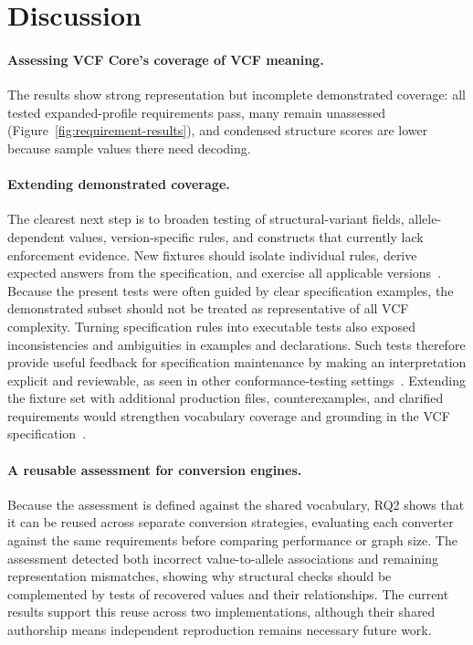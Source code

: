 \section{Discussion}
\label{sec:discussion}


\paragraph{Assessing VCF Core's coverage of VCF meaning.}
\label{sec:summary}
The results show strong representation but incomplete demonstrated coverage: all tested expanded-profile requirements pass, many remain unassessed (Figure~\ref{fig:requirement-results}), and condensed structure scores are lower because sample values there need decoding. 

\paragraph{Extending demonstrated coverage.}
The clearest next step is to broaden testing of structural-variant fields, allele-dependent values, version-specific rules, and constructs that currently lack enforcement evidence. 
New fixtures should isolate individual rules, derive expected answers from the specification, and exercise all applicable versions~\cite{samod2016,blomqvist2012ontologytesting}. 
Because the present tests were often guided by clear specification examples, the demonstrated subset should not be treated as representative of all VCF complexity.
Turning specification rules into executable tests also exposed inconsistencies and ambiguities in examples and declarations. 
Such tests therefore provide useful feedback for specification maintenance by making an interpretation explicit and reviewable, as seen in other conformance-testing settings~\cite{bishop2005conformance,niu2022interop}. 
Extending the fixture set with additional production files, counterexamples, and clarified requirements would strengthen vocabulary coverage and grounding in the VCF specification~\cite{beier2022fairvcf}.

\paragraph{A reusable assessment for conversion engines.}
Because the assessment is defined against the shared vocabulary, RQ2 shows that it can be reused across separate conversion strategies, evaluating each converter against the same requirements before comparing performance or graph size.
The assessment detected both incorrect value-to-allele associations and remaining representation mismatches, showing why structural checks should be complemented by tests of recovered values and their relationships.
The current results support this reuse across two implementations, although their shared authorship means independent reproduction remains necessary future work.

